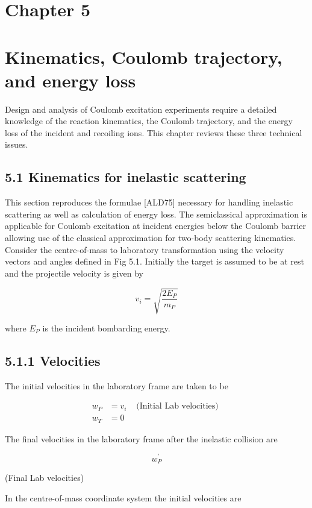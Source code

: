 \documentclass[10pt]{article}
\begin{document}
\section*{Chapter 5}
\section*{Kinematics, Coulomb trajectory, and energy loss}
Design and analysis of Coulomb excitation experiments require a detailed knowledge of the reaction kinematics, the Coulomb trajectory, and the energy loss of the incident and recoiling ions. This chapter reviews these three technical issues.

\subsection*{5.1 Kinematics for inelastic scattering}
This section reproduces the formulae [ALD75] necessary for handling inelastic scattering as well as calculation of energy loss. The semiclassical approximation is applicable for Coulomb excitation at incident energies below the Coulomb barrier allowing use of the classical approximation for two-body scattering kinematics. Consider the centre-of-mass to laboratory transformation using the velocity vectors and angles defined in Fig 5.1. Initially the target is assumed to be at rest and the projectile velocity is given by


\begin{equation*}
v_{i}=\sqrt{\frac{2 E_{P}}{m_{P}}} \tag{5.1}
\end{equation*}


where $E_{P}$ is the incident bombarding energy.

\subsection*{5.1.1 Velocities}
The initial velocities in the laboratory frame are taken to be

$$
\begin{array}{lll}
w_{P} & =v_{i} & \text { (Initial Lab velocities) } \\
w_{T} & =0 &
\end{array}
$$

The final velocities in the laboratory frame after the inelastic collision are

$$
w_{P}^{\prime}
$$

(Final Lab velocities)

In the centre-of-mass coordinate system the initial velocities are
\end{document}

